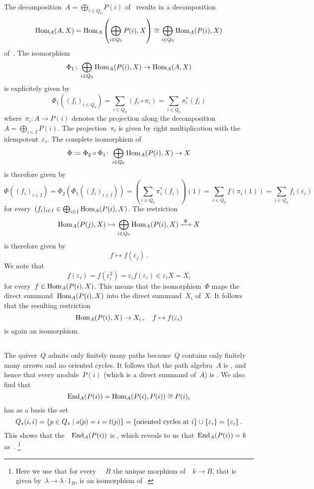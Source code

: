 The decomposition~$A = \bigoplus_{i \in Q_0} P(i)$ of~{} results in a decomposition
\[
  \operatorname{Hom}_A(A,X)
  =
  \operatorname{Hom}_A\left( \bigoplus_{i \in Q_0} P(i), X \right)
  \cong
  \bigoplus_{i \in Q_0} \operatorname{Hom}_A(P(i), X)
\]
of~{\kvss}.
The isomorphism
\[
  \Phi_1
  \colon
  \bigoplus_{i \in Q_0} \operatorname{Hom}_A(P(i), X)
  \to
  \operatorname{Hom}_A(A,X)
\]
is explicitely given by
\[
  \Phi_1((f_i)_{i \in Q_0})
  =
  \sum_{i \in Q_0} (f_i \circ \pi_i)
  =
  \sum_{i \in Q_0} \pi_i^*(f_i)
\]
where~$\pi_i \colon A \to P(i)$ denotes the projection along the decomposition~$A = \bigoplus_{i \in I} P(i)$.
The projection~$\pi_i$ is given by right multiplication with the idempotent~$\varepsilon_i$.
The complete isomorphism of~{\kvss}
\[
  \Phi
  \coloneqq
  \Phi_2 \circ \Phi_1
  \colon
  \bigoplus_{i \in Q_0} \operatorname{Hom}_A(P(i), X)
  \to
  X
\]
is therefore given by
\[
    \Phi((f_i)_{i \in I})
  = \Phi_2(\Phi_1( (f_i)_{i \in I} ) )
  = \left( \sum_{i \in Q_0} \pi_i^*(f_i) \right)(1)
  = \sum_{i \in Q_0} f(\pi_i(1))
  = \sum_{i \in Q_0} f_i(\varepsilon_i)
\]
for every~$(f_i)_{i \in I} \in \bigoplus_{i \in I} \operatorname{Hom}_A(P(i), X)$.
The restriction
\[
  \Hom_A(P(j), X)
  \inclusion
  \bigoplus_{i \in Q_0} \Hom_A(P(i), X)
  \xlongto{\Phi}
  X
\]
is therefore given by
\[
  f
  \mapsto
  f(\varepsilon_j) \,.
\]
We note that
\[
  f(\varepsilon_i)
  =
  f(\varepsilon_i^2)
  =
  \varepsilon_i f(\varepsilon_i)
  \in
  \varepsilon_i X
  =
  X_i
\]
for every~$f \in \operatorname{Hom}_A(P(i), X)$.
This means that the isomorphism~$\Phi$ maps the direct summand~$\operatorname{Hom}_A(P(i), X)$ into the direct summand~$X_i$ of~$X$.
It follows that the resulting restriction
\[
  \operatorname{Hom}_A(P(i), X)
  \to
  X_i \,,
  \quad
  f
  \mapsto
  f(\varepsilon_i)
\]
is again an isomorphism.





\addtocounter{subsection}{1}
\subsection{}

The quiver~$Q$ admits only finitely many paths because~$Q$ contains only finitely many arrows and no oriented cycles.
It follows that the path algebra~$A$ is {\fd}, and hence that every module~$P(i)$ (which is a direct summand of~$A$) is {\fd}.
We also find that
\[
        \operatorname{End}_A(P(i))
  =     \operatorname{Hom}_A(P(i),P(i))
  \cong P(i)_i
\]
has as a basis the set
\[
    Q_*(i,i)
  = \{
      p \in Q_*
    \suchthat
      s(p) = i = t(p)
    \}
  = \{
      \text{oriented cycles at~$i$}
    \}
    \cup
    \{ \varepsilon_i \}
  = \{
      \varepsilon_i
    \} \,.
\]
This shows that the~{\kalg}~$\operatorname{End}_A(P(i))$ is , which reveals to us that~$\operatorname{End}_A(P(i)) = k$ as~{\kalgs}.%
\footnote{Here we use that for every ~{\kalg}~$B$ the unique morphism of~{\kalgs}~$k \to B$, that is given by~$\lambda \to \lambda \cdot 1_B$, is an isomorphism of~{\kalgs}.}





